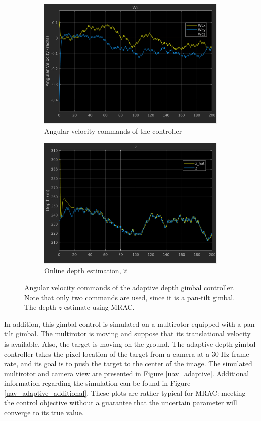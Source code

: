 \begin{figure}[htbp]
	\centering
	\begin{subfigure}{0.5\textwidth}
		\centering
		\includegraphics[width=0.9\linewidth]{images/chapter2/angular_velocity_adaptive}
		\caption{Angular velocity commands of the controller}
	\end{subfigure}%
	\begin{subfigure}{0.5\textwidth}
		\centering
		\includegraphics[width=0.9\linewidth]{images/chapter2/z_adaptive}
		\caption{Online depth estimation, $\hat{z}$}
	\end{subfigure}
	\caption[Angular velocity commands of the adaptive depth gimbal controller.]{Angular velocity commands of the adaptive depth gimbal controller. Note that only two commands are used, since it is a pan-tilt gimbal. The depth $z$ estimate using MRAC.}
	\label{adaptive_command}
\end{figure}

In addition, this gimbal control is simulated on a multirotor equipped with a pan-tilt gimbal. The multirotor is moving and suppose that its translational velocity is available. Also, the target is moving on the ground. The adaptive depth gimbal controller takes the pixel location of the target from a camera at a 30 Hz frame rate, and its goal is to push the target to the center of the image. The simulated multirotor and camera view are presented in Figure \ref{uav_adaptive}. Additional information regarding the simulation can be found in Figure \ref{uav_adaptive_additional}. These plots are rather typical for MRAC: meeting the control objective without a guarantee that the uncertain parameter will converge to its true value. 

